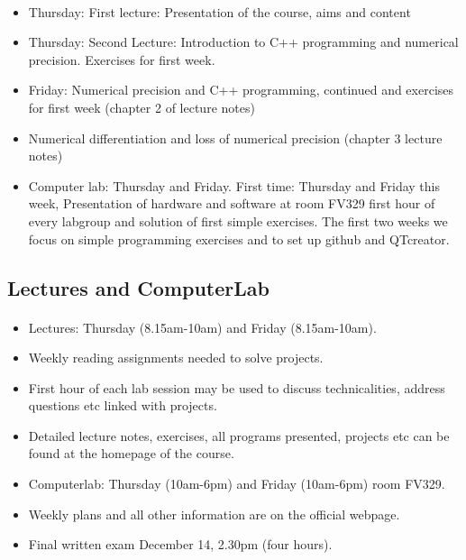 \documentclass[%
oneside,                 %
final,                   %
10pt]{article}
\begin{document}
\paragraph{}
\begin{itemize}
  \item Thursday: First lecture: Presentation of the course, aims and content

  \item Thursday: Second Lecture: Introduction to C++ programming and numerical precision. Exercises for first week. 

  \item Friday: Numerical precision and C++ programming, continued and exercises for first week (chapter 2 of lecture notes)

  \item Numerical differentiation and loss of numerical precision (chapter 3 lecture notes)

  \item Computer lab: Thursday and Friday. First time: Thursday and Friday this week, Presentation of hardware and software at room FV329 first hour of every labgroup and solution of first simple exercises. The first two weeks we focus on simple programming exercises and to set up github and QTcreator.
\end{itemize}

\noindent



\subsection{Lectures and ComputerLab}


\paragraph{}
\begin{itemize}
  \item Lectures: Thursday (8.15am-10am) and Friday (8.15am-10am).

  \item Weekly reading assignments needed to solve projects.

  \item First hour of each lab session may be used to discuss technicalities, address questions etc linked with projects.

  \item Detailed lecture notes, exercises, all programs presented, projects etc can be found at the homepage of the course.

  \item Computerlab: Thursday (10am-6pm) and Friday (10am-6pm) room FV329.

  \item Weekly plans and all other information are on the official webpage.

  \item Final written exam December 14, 2.30pm (four hours).
\end{itemize}
\end{document}
